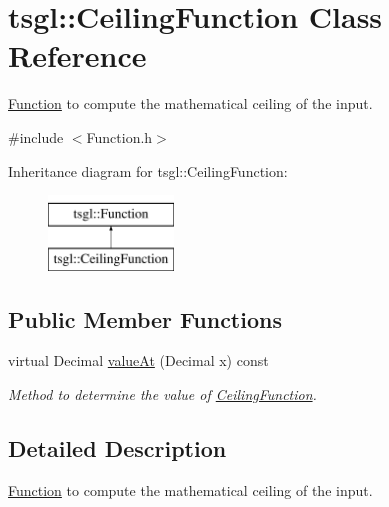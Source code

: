 \hypertarget{classtsgl_1_1_ceiling_function}{\section{tsgl\-:\-:\-Ceiling\-Function \-Class \-Reference}
\label{classtsgl_1_1_ceiling_function}
}


\hyperlink{classtsgl_1_1_function}{\-Function} to compute the mathematical ceiling of the input.  




{\ttfamily \#include $<$\-Function.\-h$>$}

\-Inheritance diagram for tsgl\-:\-:\-Ceiling\-Function\-:\begin{figure}[H]
\begin{center}
\leavevmode
\includegraphics[height=2.000000cm]{classtsgl_1_1_ceiling_function}
\end{center}
\end{figure}
\subsection*{\-Public \-Member \-Functions}
\begin{DoxyCompactItemize}
\item 
virtual \-Decimal \hyperlink{classtsgl_1_1_ceiling_function_ab47498860b2395e331f203c4025bcb81}{value\-At} (\-Decimal x) const 
\begin{DoxyCompactList}\small\item\em \-Method to determine the value of \hyperlink{classtsgl_1_1_ceiling_function}{\-Ceiling\-Function}. \end{DoxyCompactList}\end{DoxyCompactItemize}


\subsection{\-Detailed \-Description}
\hyperlink{classtsgl_1_1_function}{\-Function} to compute the mathematical ceiling of the input. 

